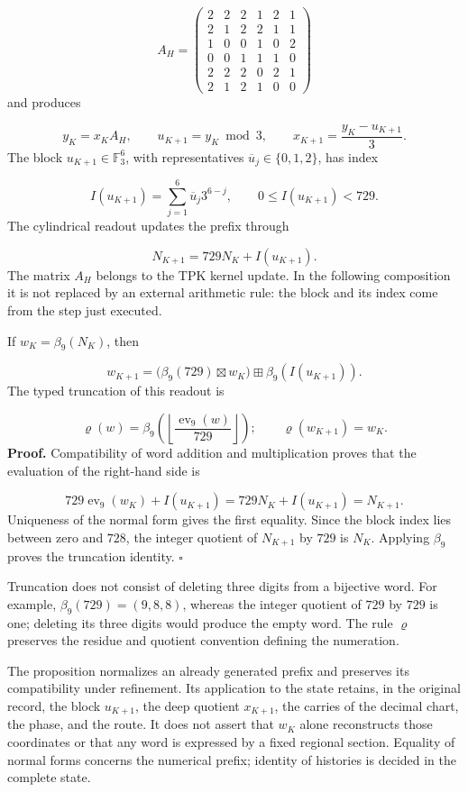 \[
A_H=
\begin{pmatrix}
2&2&2&1&2&1\\
2&1&2&2&1&1\\
1&0&0&1&0&2\\
0&0&1&1&1&0\\
2&2&2&0&2&1\\
2&1&2&1&0&0
\end{pmatrix}
\]
and produces

\[
y_K=x_KA_H,\qquad
u_{K+1}=y_K\bmod3,\qquad
x_{K+1}=\frac{y_K-u_{K+1}}3.
\]
The block \(u_{K+1}\in\mathbb F_3^6\), with representatives \(\overline u_j\in\{0,1,2\}\), has index

\[
I(u_{K+1})=\sum_{j=1}^{6}\overline u_j3^{6-j},
\qquad 0\leq I(u_{K+1})<729.
\]
The cylindrical readout updates the prefix through

\[
N_{K+1}=729N_K+I(u_{K+1}).
\]
The matrix \(A_H\) belongs to the TPK kernel update. In the following composition it is not replaced by an external arithmetic rule: the block and its index come from the step just executed.

If \(w_K=\beta_9(N_K)\), then

\[
w_{K+1}
=\bigl(\beta_9(729)\boxtimes w_K\bigr)
\boxplus\beta_9(I(u_{K+1})).
\]
The typed truncation of this readout is

\[
\varrho(w)=
\beta_9\!\left(
\left\lfloor\frac{\operatorname{ev}_9(w)}{729}\right\rfloor
\right);
\qquad \varrho(w_{K+1})=w_K.
\]
\textbf{Proof.} Compatibility of word addition and multiplication proves that the evaluation of the right-hand side is

\[
729\operatorname{ev}_9(w_K)+I(u_{K+1})
=729N_K+I(u_{K+1})=N_{K+1}.
\]
Uniqueness of the normal form gives the first equality. Since the block index lies between zero and \(728\), the integer quotient of \(N_{K+1}\) by \(729\) is \(N_K\). Applying \(\beta_9\) proves the truncation identity. \hfill\(\square\)

Truncation does not consist of deleting three digits from a bijective word. For example, \(\beta_9(729)=(9,8,8)\), whereas the integer quotient of \(729\) by \(729\) is one; deleting its three digits would produce the empty word. The rule \(\varrho\) preserves the residue and quotient convention defining the numeration.

The proposition normalizes an already generated prefix and preserves its compatibility under refinement. Its application to the state retains, in the original record, the block \(u_{K+1}\), the deep quotient \(x_{K+1}\), the carries of the decimal chart, the phase, and the route. It does not assert that \(w_K\) alone reconstructs those coordinates or that any word is expressed by a fixed regional section. Equality of normal forms concerns the numerical prefix; identity of histories is decided in the complete state.

